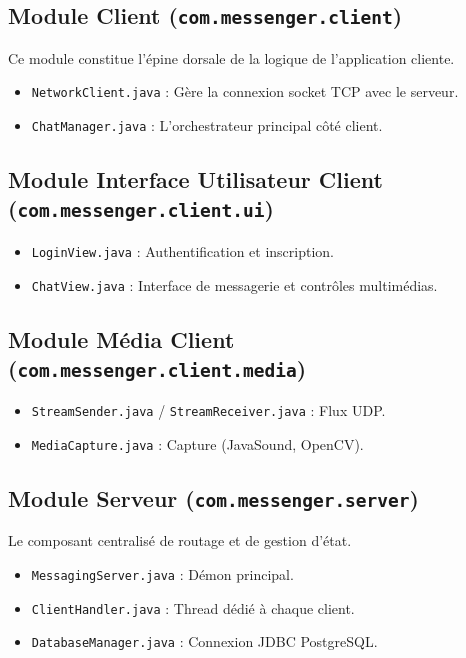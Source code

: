 \documentclass[12pt,a4paper]{article}
\begin{document}
\subsection{Module Client (\texttt{com.messenger.client})}
Ce module constitue l'épine dorsale de la logique de l'application cliente.
\begin{itemize}
    \item \texttt{NetworkClient.java} : Gère la connexion socket TCP avec le serveur.
    \item \texttt{ChatManager.java} : L'orchestrateur principal côté client.
\end{itemize}

\subsection{Module Interface Utilisateur Client (\texttt{com.messenger.client.ui})}
\begin{itemize}
    \item \texttt{LoginView.java} : Authentification et inscription.
    \item \texttt{ChatView.java} : Interface de messagerie et contrôles multimédias.
\end{itemize}

\subsection{Module Média Client (\texttt{com.messenger.client.media})}
\begin{itemize}
    \item \texttt{StreamSender.java} / \texttt{StreamReceiver.java} : Flux UDP.
    \item \texttt{MediaCapture.java} : Capture (JavaSound, OpenCV).
\end{itemize}

\subsection{Module Serveur (\texttt{com.messenger.server})}
Le composant centralisé de routage et de gestion d'état.
\begin{itemize}
    \item \texttt{MessagingServer.java} : Démon principal.
    \item \texttt{ClientHandler.java} : Thread dédié à chaque client.
    \item \texttt{DatabaseManager.java} : Connexion JDBC PostgreSQL.
\end{itemize}
\end{document}
